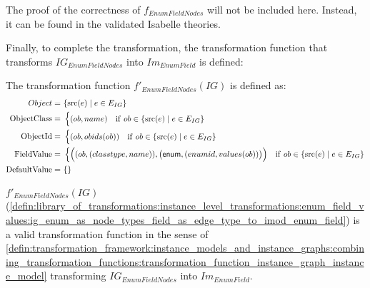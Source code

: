 The proof of the correctness of $f_{EnumFieldNodes}$ will not be included here. Instead, it can be found in the validated Isabelle theories.

Finally, to complete the transformation, the transformation function that transforms $IG_{EnumFieldNodes}$ into $Im_{EnumField}$ is defined:

\begin{defin}
\label{defin:library_of_transformations:instance_level_transformations:enum_field_values:ig_enum_as_node_types_field_as_edge_type_to_imod_enum_field}
The transformation function $f'_{EnumFieldNodes}(IG)$ is defined as:
\begin{align*}
Object =\ &\{\mathrm{src}(e) \mid e \in E_{IG}\} \\
\mathrm{ObjectClass} =\ & \begin{cases}
    (ob, name) & \mathrm{if }\ ob \in \{\mathrm{src}(e) \mid e \in E_{IG}\}
\end{cases}\\
\mathrm{ObjectId} =\ & \begin{cases}
    (ob, obids(ob)) & \mathrm{if }\ ob \in \{\mathrm{src}(e) \mid e \in E_{IG}\}
\end{cases}\\
\mathrm{FieldValue} =\ & \begin{cases}
    \Big((ob, (classtype, name)), \big(\mathsf{enum}, (enumid, values(ob))\big)\Big) & \mathrm{if }\ ob \in \{\mathrm{src}(e) \mid e \in E_{IG}\}
\end{cases} \\
\mathrm{DefaultValue} =\ & \{\}
\end{align*}
\end{defin}

\begin{thm}
\label{defin:library_of_transformations:instance_level_transformations:enum_field_values:ig_enum_as_node_types_field_as_edge_type_to_tmod_class_func}
$f'_{EnumFieldNodes}(IG)$ (\cref{defin:library_of_transformations:instance_level_transformations:enum_field_values:ig_enum_as_node_types_field_as_edge_type_to_imod_enum_field}) is a valid transformation function in the sense of \cref{defin:transformation_framework:instance_models_and_instance_graphs:combining_transformation_functions:transformation_function_instance_graph_instance_model} transforming $IG_{EnumFieldNodes}$ into $Im_{EnumField}$.
\end{thm}

